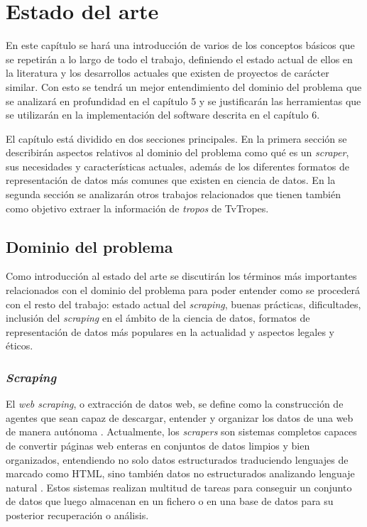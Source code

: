 \chapter{Estado del arte}

En este capítulo se hará una introducción de varios de los conceptos básicos que
se repetirán a lo largo de todo el trabajo, definiendo el estado actual de ellos
en la literatura y los desarrollos actuales que existen de proyectos de carácter
similar. Con esto se tendrá un mejor entendimiento del dominio del problema que
se analizará en profundidad en el capítulo 5 y se justificarán las herramientas
que se utilizarán en la implementación del software descrita en el capítulo 6.

El capítulo está dividido en dos secciones principales. En la primera sección se
describirán aspectos relativos al dominio del problema como qué es un
\textit{scraper}, sus necesidades y características actuales, además de los
diferentes formatos de representación de datos más comunes que existen en
ciencia de datos. En la segunda sección se analizarán otros trabajos
relacionados que tienen también como objetivo extraer la información de
\textit{tropos} de TvTropes. 

\section{Dominio del problema}
Como introducción al estado del arte se discutirán los términos más importantes
relacionados con el dominio del problema para poder entender como se procederá
con el resto del trabajo: estado actual del \textit{scraping}, buenas prácticas,
dificultades, inclusión del \textit{scraping} en el ámbito de la ciencia de
datos, formatos de representación de datos más populares en la actualidad y
aspectos legales y éticos.

\subsection{\textit{Scraping}}

El \textit{web scraping}, o extracción de datos web, se define como la
construcción de agentes que sean capaz de descargar, entender y organizar los
datos de una web de manera autónoma \cite{apress2018scraping}. Actualmente, los
\textit{scrapers} son sistemas completos capaces de convertir páginas web
enteras en conjuntos de datos limpios y bien organizados, entendiendo no solo
datos estructurados traduciendo lenguajes de marcado como HTML, sino también
datos no estructurados analizando lenguaje natural \cite{zhao2017web}. Estos
sistemas realizan multitud de tareas para conseguir un conjunto de datos que
luego almacenan en un fichero o en una base de datos para su posterior
recuperación o análisis.

